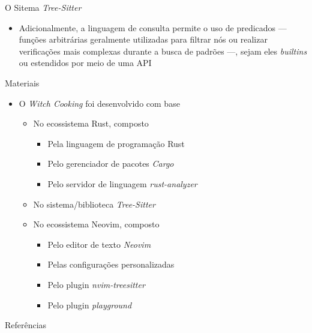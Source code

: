 \documentclass
  [ aspectratio=169,
    english,
    hyperref={citecolor=blue,colorlinks=true,linkcolor=blue,urlcolor=blue},
    brazil]
  {beamer}
\newcommand{\treesitter}{\textit{Tree-Sitter}\xspace}
\newcommand{\witchcooking}{\textit{Witch Cooking}\xspace}
\begin{document}
  \begin{frame}{O Sitema \treesitter}
    \begin{itemize}
      \item Adicionalmente, a linguagem de consulta permite o uso de predicados
            --- funções arbitrárias geralmente utilizadas para filtrar nós ou
            realizar verificações mais complexas durante a busca de padrões
            ---, sejam eles \textit{builtins} ou estendidos por meio de uma API
    \end{itemize}
  \end{frame}


  \begin{frame}{Materiais}
    \begin{itemize}
      \item O \witchcooking foi desenvolvido com base
            \begin{itemize}
              \item No ecossistema Rust, composto
                    \begin{itemize}
                      \item Pela linguagem de programação Rust
                            \cite{rust-2023-rust}
                      \item Pelo gerenciador de pacotes \textit{Cargo}
                            \cite{rust-2023-cargo}
                      \item Pelo servidor de linguagem \textit{rust-analyzer}
                            \cite{rust-analyzer-2023-rust}
                    \end{itemize}
              \item No sistema/biblioteca \treesitter
                    \cite{tree-sitter-2023-tree}
              \item No ecossistema Neovim, composto
                    \begin{itemize}
                      \item Pelo editor de texto \textit{Neovim}
                            \cite{neovim-2023-hyperextensible}
                      \item Pelas configurações personalizadas
                            \cite{silva-2023-uma}
                      \item Pelo plugin \textit{nvim-treesitter}
                            \cite{nvim-treesitter-2023-nvim}
                      \item Pelo plugin \textit{playground}
                            \cite{nvim-treesitter-2023-playground}
                    \end{itemize}
            \end{itemize}
    \end{itemize}
  \end{frame}


  \begin{frame}[allowframebreaks]{Referências}\printbibliography\end{frame}
\end{document}
